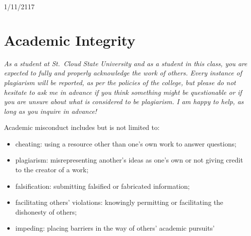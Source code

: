 \documentclass{tufte-handout}
\begin{document}
\begin{fullwidth}
\begin{calendar}{1/11/21}{17}




  \end{calendar}

\section{Academic Integrity}




\emph{As a student at St.\ Cloud State University and as a student in this class, you are expected to fully and properly acknowledge the work of others. Every instance of plagiarism will be reported, as per the policies of the college, but please do not hesitate to ask me in advance if you think something might be questionable or if you are unsure about what is considered to be plagiarism. I am happy to help, as long as you inquire in advance! }

Academic misconduct includes but is not limited to:

\begin{itemize}
	\item cheating: using a resource other than one's own work to answer questions;
	\item plagiarism: misrepresenting another's ideas as one's own or not giving credit to the creator of a work;
	\item falsification: submitting falsified or fabricated information;
	\item facilitating others' violations: knowingly permitting or facilitating the dishonesty of others;
	\item impeding: placing barriers in the way of others' academic pursuits'
\end{itemize}




\end{fullwidth}



\end{document}
